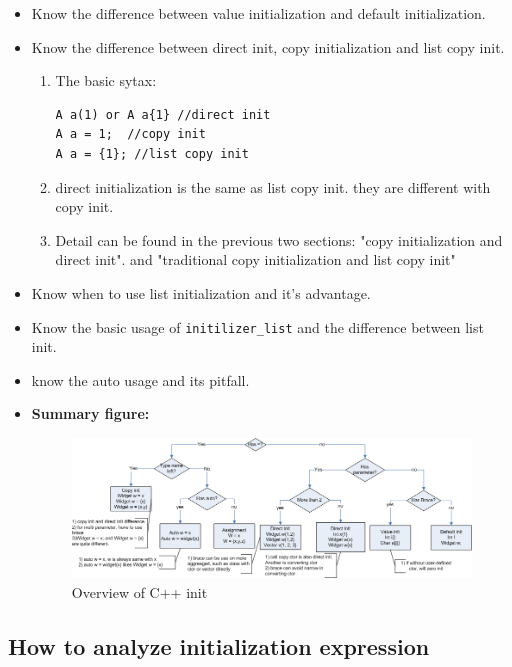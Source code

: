 \documentclass[a4paper,11pt,twoside]{book}
\begin{document}
\begin{itemize}
	\item Know the difference between value initialization and default initialization. 

	\item Know the difference between direct init, copy initialization and list copy init. 
	\begin{enumerate}
		\item The basic sytax:
\begin{lstlisting}
A a(1) or A a{1} //direct init
A a = 1;  //copy init
A a = {1}; //list copy init	
\end{lstlisting}	 
		\item direct initialization is the same as list copy init. they are different with copy init.
		\item Detail can be found in the previous two sections: "copy initialization and direct init". and "traditional copy initialization and list copy init"
		
	\end{enumerate}
  
	\item Know when to use list initialization and it's advantage.
	
	\item Know the basic usage of \texttt{initilizer\_list} and the difference between list init.
	
	\item know the auto usage and its pitfall.
 
	\item \textbf{Summary figure:}
	\begin{figure}[h]
		\centering
		\includegraphics[width=0.95\linewidth]{pics/init.png}
		\caption{Overview of C++ init}
		\label{fig:command}
	\end{figure}
	
\end{itemize}

\subsection{How to analyze initialization expression}
\end{document}
